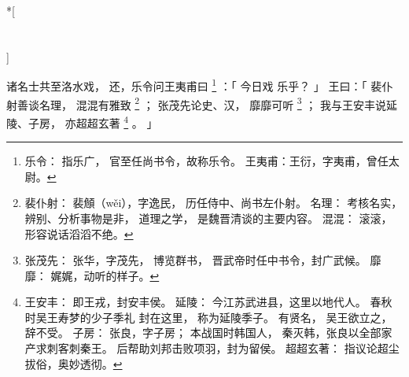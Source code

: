 
\switchcolumn[0]*[\section{}]

诸名士共至洛水戏，
还，乐令问王夷甫曰%
\footnote{%
    乐令：
        指乐广，
        官至任尚书令，故称乐令。
    王夷甫：王衍，字夷甫，曾任太尉。
}%
：「
    今日戏
    乐乎？
」
王曰：「
    裴仆射善谈名理，
    混混有雅致%
    \footnote{%
        裴仆射：
            裴頠（wěi），字逸民，
            历任侍中、尚书左仆射。
        名理：
            考核名实，辨别、分析事物是非，
            道理之学，
            是魏晋清谈的主要内容。
        混混：
            滚滚，形容说话滔滔不绝。
    }%
    ；
    张茂先论史、汉，
    靡靡可听%
    \footnote{%
        张茂先：
            张华，字茂先，
            博览群书，
            晋武帝时任中书令，封广武候。
        靡靡：
            娓娓，动听的样子。
    }%
    ；
    我与王安丰说延陵、子房，
    亦超超玄著%
    \footnote{%
        王安丰：
            即王戎，封安丰侯。
        延陵：
            今江苏武进县，这里以地代人。
            春秋时吴王寿梦的少子季礼
            封在这里，
            称为延陵季子。
            有贤名，
            吴王欲立之，辞不受。
        子房：
            张良，字子房；
            本战国时韩国人，
            秦灭韩，张良以全部家产求刺客刺秦王。
            后帮助刘邦击败项羽，封为留侯。
        超超玄著：
            指议论超尘拔俗，奥妙透彻。
    }%
    。
」

\switchcolumn


